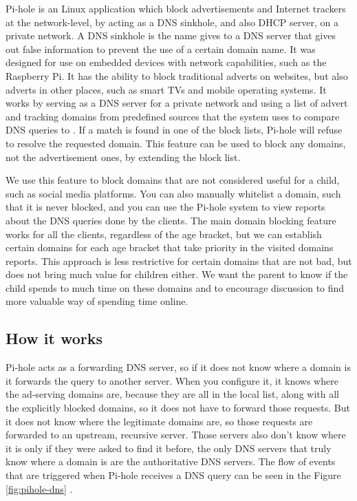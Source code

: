 Pi-hole is an Linux application which block advertisements and Internet trackers at the network-level, by acting as a DNS sinkhole, and also DHCP server, on a private network. A DNS sinkhole is the name gives to a DNS server that gives out false information to prevent the use of a certain domain name. It was designed for use on embedded devices with network capabilities, such as the Raspberry Pi. It has the ability to block traditional adverts on websites, but also adverts in other places, such as smart TVs and mobile operating systems. It works by serving as a DNS server for a private network and using a list of advert and tracking domains from predefined sources that the system uses to compare DNS queries to \citep{salmela2015pihole}. If a match is found in one of the block lists, Pi-hole will refuse to resolve the requested domain. This feature can be used to block any domains, not the advertisement ones, by extending the block list. 

We use this feature to block domains that are not considered useful for a child, such as social media platforms. You can also manually whitelist a domain, such that it is never blocked, and you can use the Pi-hole system to view reports about the DNS queries done by the clients. The main domain blocking feature works for all the clients, regardless of the age bracket, but we can establish certain domains for each age bracket that take priority in the visited domains reports. This approach is less restrictive for certain domains that are not bad, but does not bring much value for children either. We want the parent to know if the child spends to much time on these domains and to encourage discussion to find more valuable way of spending time online.

\subsection{How it works}

Pi-hole acts as a forwarding DNS server, so if it does not know where a domain is it forwards the query to another server. When you configure it, it knows where the ad-serving domains are, because they are all in the local list, along with all the explicitly blocked domains, so it does not have to forward those requests. But it does not know where the legitimate domains are, so those requests are forwarded to an upstream, recursive server. Those servers also don't know where it is only if they were asked to find it before, the only DNS servers that truly know where a domain is are the authoritative DNS servers. The flow of events that are triggered when Pi-hole receives a DNS query can be seen in the Figure \ref{fig:pihole-dns} \citep{salmela2017ftldns}.

